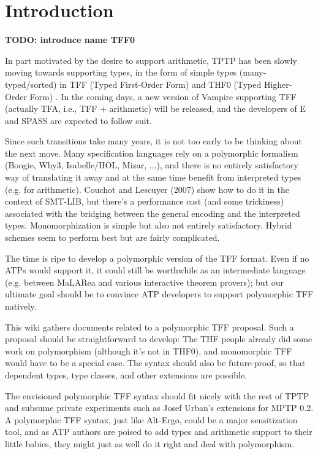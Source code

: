 \section{Introduction}
\label{sec_intro}

\textbf{TODO: introduce name TFF0}

In part motivated by the desire to support arithmetic, TPTP has been slowly
moving towards supporting types, in the form of simple types (many-typed/sorted)
in TFF (Typed First-Order Form) \cite{TFF0} and THF0 (Typed Higher-Order Form)
\cite{xxx}. In the coming days, a new version of Vampire supporting TFF
(actually TFA, i.e., TFF + arithmetic) will be released, and the developers of E
and SPASS are expected to follow suit.

Since such transitions take many years, it is not too early to be thinking about
the next move. Many specification languages rely on a polymorphic formalism
(Boogie, Why3, Isabelle/HOL, Mizar, ...), and there is no entirely satisfactory
way of translating it away and at the same time benefit from interpreted types
(e.g. for arithmetic). Couchot and Lescuyer (2007) show how to do it in the
context of SMT-LIB, but there's a performance cost (and some trickiness)
associated with the bridging between the general encoding and the interpreted
types. Monomorphization is simple but also not entirely satisfactory. Hybrid
schemes seem to perform best but are fairly complicated.

The time is ripe to develop a polymorphic version of the TFF format. Even if no
ATPs would support it, it could still be worthwhile as an intermediate language
(e.g. between MaLARea and various interactive theorem provers); but our ultimate
goal should be to convince ATP developers to support polymorphic TFF natively.

This wiki gathers documents related to a polymorphic TFF proposal. Such a
proposal should be straightforward to develop: The THF people already did some
work on polymorphism (although it's not in THF0), and monomorphic TFF would have
to be a special case. The syntax should also be future-proof, so that dependent
types, type classes, and other extensions are possible.

The envisioned polymorphic TFF syntax should fit nicely with the rest of TPTP
and subsume private experiments such as Josef Urban's extensions for MPTP 0.2. A
polymorphic TFF syntax, just like Alt-Ergo, could be a major sensitization tool,
and as ATP authors are poised to add types and arithmetic support to their
little babies, they might just as well do it right and deal with polymorphism.
